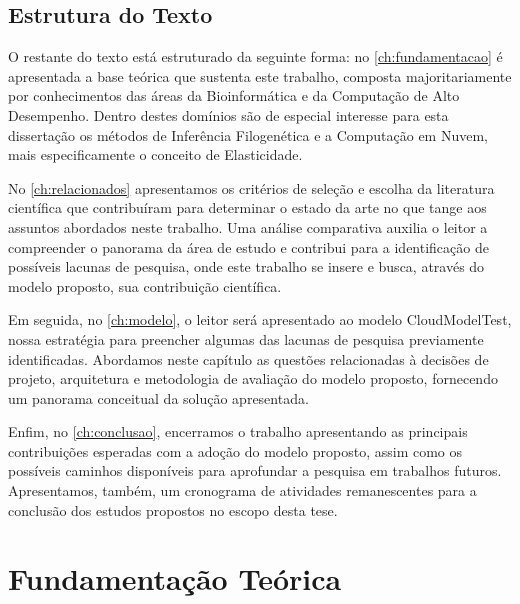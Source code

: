 \documentclass[english,brazilian]{UNISINOSmonografia} %
\begin{document}

\section{Estrutura do Texto}


O restante do texto está estruturado da seguinte forma: no \autoref{ch:fundamentacao} é apresentada a base teórica que sustenta este trabalho, composta majoritariamente por conhecimentos das áreas da Bioinformática e da Computação de Alto Desempenho. 
Dentro destes domínios são de especial interesse para esta dissertação os métodos de Inferência Filogenética e a Computação em Nuvem, mais especificamente o conceito de Elasticidade.

No \autoref{ch:relacionados} apresentamos os critérios de seleção e escolha da literatura científica que contribuíram para determinar o estado da arte no que tange aos assuntos abordados neste trabalho.
Uma análise comparativa auxilia o leitor a compreender o panorama da área de estudo e contribui para a identificação de possíveis lacunas de pesquisa, onde este trabalho se insere e busca, através do modelo proposto, sua contribuição científica.

Em seguida, no \autoref{ch:modelo}, o leitor será apresentado ao modelo CloudModelTest, nossa estratégia para preencher algumas das lacunas de pesquisa previamente identificadas.
Abordamos neste capítulo as questões relacionadas à decisões de projeto, arquitetura e metodologia de avaliação do modelo proposto, fornecendo um panorama conceitual da solução apresentada.

Enfim, no \autoref{ch:conclusao}, encerramos o trabalho apresentando as principais contribuições esperadas com a adoção do modelo proposto, assim como os possíveis caminhos disponíveis para aprofundar a pesquisa em trabalhos futuros.
Apresentamos, também, um cronograma de atividades remanescentes para a conclusão dos estudos propostos no escopo desta tese.


\chapter{Fundamentação Teórica}
\label{ch:fundamentacao}
\end{document}
